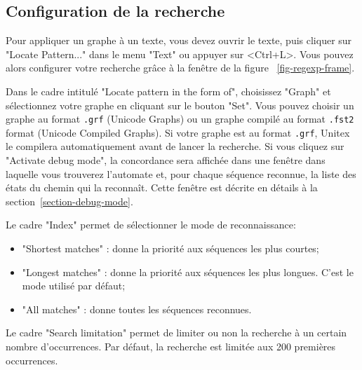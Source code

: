 \subsection{Configuration de la recherche}
Pour appliquer un graphe à un texte, vous devez ouvrir le texte, puis cliquer sur "Locate
Pattern..." dans le menu "Text" ou appuyer sur <Ctrl+L>. Vous pouvez alors configurer votre
recherche grâce à la fenêtre de la figure
~\ref{fig-regexp-frame}.

\bigskip
{}
\noindent Dans le cadre intitulé "Locate pattern in the form of", choisissez "Graph" et sélectionnez
votre graphe en cliquant sur le bouton "Set". Vous pouvez choisir un graphe au format
 \verb+.grf+ (Unicode Graphs) ou un graphe compilé au format \verb+.fst2+ format (Unicode
Compiled Graphs). Si votre graphe est au format \verb+.grf+, Unitex le compilera
 automatiquement avant de lancer la recherche. Si vous cliquez sur "Activate debug mode", la
 concordance sera affichée dans une fenêtre dans laquelle vous trouverez l'automate et, 
 pour chaque séquence reconnue, la liste des états du chemin qui la reconnaît. Cette fenêtre est décrite en détails à la section~\ref{section-debug-mode}.


\bigskip
\noindent Le cadre "Index" permet de sélectionner le mode de reconnaissance:

\bigskip
{}
\begin{itemize}
  \item "Shortest matches" : donne la priorité aux séquences les plus courtes;
  \item "Longest matches" :  donne la priorité aux séquences les plus longues. C’est le mode
utilisé par défaut;
  \item "All matches" : donne toutes les séquences reconnues.
\end{itemize}

\bigskip
\noindent 
Le cadre "Search limitation" permet de limiter ou non la recherche à un certain nombre
d’occurrences. Par défaut, la recherche est limitée aux 200 premières occurrences.

